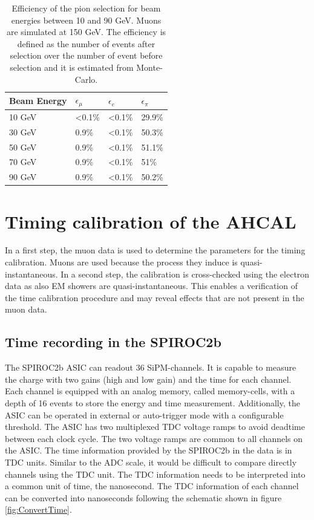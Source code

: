 \documentclass{JINST}
\begin{document}
\begin{table}[htb!]
	\centering
	\caption{Efficiency of the pion selection for beam energies between 10 and 90 GeV. Muons are simulated at 150 GeV. The efficiency is defined as the number of events after selection over the number of event before selection and it is estimated from Monte-Carlo.}
	\label{table:eff_pion}
	\begin{tabular}{@{} llll @{}}
		\toprule
		\textbf{Beam Energy} & \textbf{$\epsilon_{\mu}$} & \textbf{$\epsilon_{e}$} & \textbf{$\epsilon_{\pi}$}\\
		\midrule
		10 GeV & <0.1\% & <0.1\% & 29.9\%\\
		30 GeV & 0.9\% & <0.1\% & 50.3\%\\
		50 GeV & 0.9\% & <0.1\% & 51.1\%\\
		70 GeV & 0.9\% & <0.1\% & 51\%\\
		90 GeV & 0.9\% & <0.1\% & 50.2\%\\
		\bottomrule
	\end{tabular}
\end{table}

\section{Timing calibration of the AHCAL}

In a first step, the muon data is used to determine the parameters for the timing calibration. Muons are used because the process they induce is quasi-instantaneous. In a second step, the calibration is cross-checked using the electron data as also EM showers are quasi-instantaneous. This enables a verification of the time calibration procedure and may reveal effects that are not present in the muon data.

\subsection{Time recording in the SPIROC2b}

The SPIROC2b ASIC can readout 36 SiPM-channels. It is capable to measure the charge with two gains (high and low gain) and the time for each channel. Each channel is equipped with an analog memory, called memory-cells, with a depth of 16 events to store the energy and time measurement. Additionally, the ASIC can be operated in external or auto-trigger mode with a configurable threshold. The ASIC has two multiplexed TDC voltage ramps to avoid deadtime between each clock cycle. The two voltage ramps are common to all channels on the ASIC. The time information provided by the SPIROC2b in the data is in TDC units. Similar to the ADC scale, it would be difficult to compare directly channels using the TDC unit. The TDC information needs to be interpreted into a common unit of time, the nanosecond. The TDC information of each channel can be converted into nanoseconds following the schematic shown in figure \ref{fig:ConvertTime}.
\end{document}
